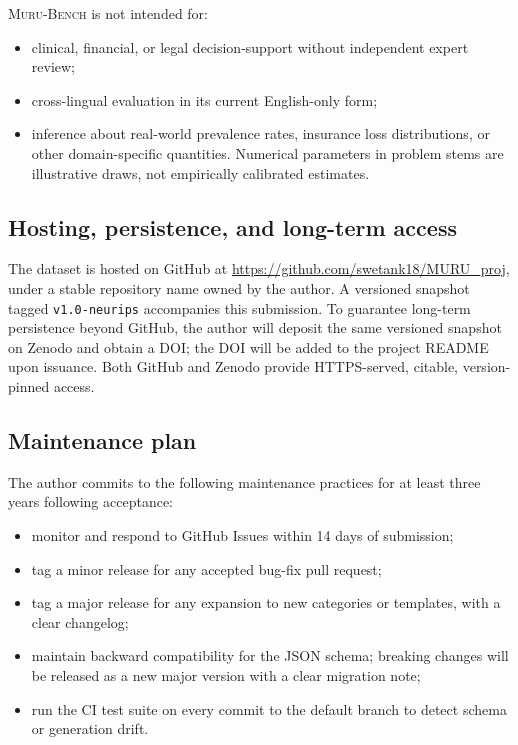 \documentclass{article}
\newcommand{\muru}{\textsc{Muru-Bench}}
\begin{document}
\muru{} is not intended for:
\begin{itemize}[leftmargin=*,itemsep=2pt]
    \item clinical, financial, or legal decision-support without independent expert review;
    \item cross-lingual evaluation in its current English-only form;
    \item inference about real-world prevalence rates, insurance loss distributions, or other domain-specific quantities. Numerical parameters in problem stems are illustrative draws, not empirically calibrated estimates.
\end{itemize}

\subsection*{Hosting, persistence, and long-term access}

The dataset is hosted on GitHub at \url{https://github.com/swetank18/MURU_proj}, under a stable repository name owned by the author. A versioned snapshot tagged \texttt{v1.0-neurips} accompanies this submission. To guarantee long-term persistence beyond GitHub, the author will deposit the same versioned snapshot on Zenodo and obtain a DOI; the DOI will be added to the project README upon issuance. Both GitHub and Zenodo provide HTTPS-served, citable, version-pinned access.

\subsection*{Maintenance plan}

The author commits to the following maintenance practices for at least three years following acceptance:
\begin{itemize}[leftmargin=*,itemsep=2pt]
    \item monitor and respond to GitHub Issues within 14 days of submission;
    \item tag a minor release for any accepted bug-fix pull request;
    \item tag a major release for any expansion to new categories or templates, with a clear changelog;
    \item maintain backward compatibility for the JSON schema; breaking changes will be released as a new major version with a clear migration note;
    \item run the CI test suite on every commit to the default branch to detect schema or generation drift.
\end{itemize}
\end{document}
